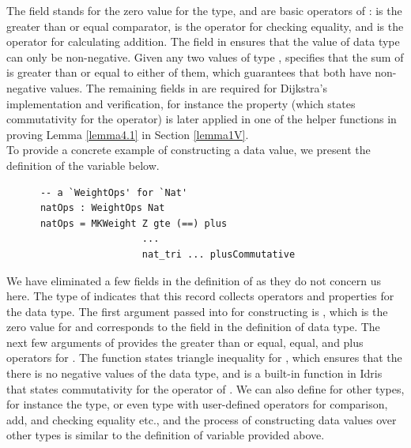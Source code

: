 The  field stands for the zero value for the  type, and  are basic operators of :  is the greater than or equal comparator,  is the operator for checking equality, and  is the operator for calculating addition. The  field in  ensures that the value of  data type can only be non-negative. Given any two values  of type ,  specifies that the sum of  is greater than or equal to either of them, which guarantees that both  have non-negative values. The remaining fields in  are required for Dijkstra's implementation and verification, for instance the  property (which states commutativity for the  operator) is later applied in one of the helper functions in proving Lemma \ref{lemma4.1} in Section \ref{lemma1V}. 
\\

To provide a concrete example of constructing a  data value, we present the definition of the  variable below. 
\begin{lstlisting}
      -- a `WeightOps' for `Nat'
      natOps : WeightOps Nat
      natOps = MKWeight Z gte (==) plus
                        ...
                        nat_tri ... plusCommutative
\end{lstlisting}

We have eliminated a few fields in the definition of  as they do not concern us here. The type of  indicates that this record collects operators and properties for the  data type. The first argument passed into  for constructing  is , which is the zero value for  and corresponds to the  field in the definition of  data type. The next few arguments of  provides the greater than or equal, equal, and plus operators for . The  function states triangle inequality for , which ensures that the there is no negative values of the  data type, and  is a built-in function in Idris that states commutativity for the  operator of . We can also define  for other  types, for instance the  type, or even  type with user-defined operators for comparison, add, and checking equality etc., and the process of constructing  data values over other  types is similar to the definition of  variable provided above. 
\\

